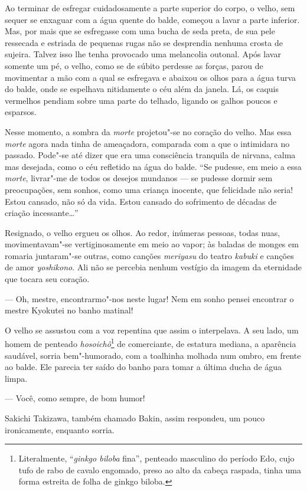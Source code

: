 Ao terminar de esfregar cuidadosamente a parte superior do corpo, o
velho, sem sequer se enxaguar com a água quente do balde, começou a
lavar a parte inferior. Mas, por mais que se esfregasse com uma bucha
de seda preta, de sua pele ressecada e estriada de pequenas rugas não
se desprendia nenhuma crosta de sujeira. Talvez isso lhe tenha
provocado uma melancolia outonal. Após lavar somente um pé, o velho,
como se de súbito perdesse as forças, parou de movimentar a mão com a
qual se esfregava e abaixou os olhos para a água turva do balde, onde
se espelhava nitidamente o céu além da janela. Lá, os caquis vermelhos
pendiam sobre uma parte do telhado, ligando os galhos poucos e esparsos. 

Nesse momento, a sombra da \textit{morte} projetou"-se no coração do velho. Mas 
essa \textit{morte} agora nada tinha de ameaçadora, comparada com a que o
intimidara no passado. Pode"-se até dizer que era uma consciência 
tranquila de nirvana, calma mas desejada, como o céu refletido na água
do balde. ``Se pudesse, em meio a essa \textit{morte}, livrar"-me de todos os 
desejos mundanos --- se pudesse dormir sem preocupações, sem sonhos, como
uma criança inocente, que felicidade não seria! Estou cansado, não só 
da vida. Estou cansado do sofrimento de décadas de criação
incessante\ldots{}''

Resignado, o velho ergueu os olhos. Ao redor, inúmeras pessoas, todas
nuas, movimentavam"-se vertiginosamente em meio ao vapor; às baladas de   
monges em romaria juntaram"-se outras, como canções \textit{meriyasu} do
teatro \textit{kabuki} e canções de amor \textit{yoshikono}. Ali não se percebia
nenhum vestígio da imagem da eternidade que tocara seu coração.

--- Oh, mestre, encontrarmo"-nos neste lugar! Nem em sonho pensei
encontrar o mestre Kyokutei no banho matinal!

O velho se assustou com a voz repentina que assim o interpelava. A seu
lado, um homem de penteado \textit{hosoichô}\footnote{ Literalmente, ``\textit{ginkgo biloba} fina'', 
penteado masculino do período Edo, cujo tufo de rabo de cavalo 
engomado, preso ao alto da cabeça raspada, tinha uma forma estreita de folha de ginkgo biloba.} 
de comerciante, de estatura mediana, a aparência saudável, sorria bem"-humorado, com a
toalhinha molhada num ombro, em frente ao balde. Ele parecia ter saído
do banho para tomar a última ducha de água limpa.

--- Você, como sempre, de bom humor!

Sakichi Takizawa, também chamado Bakin, assim respondeu, um pouco
ironicamente, enquanto sorria.

